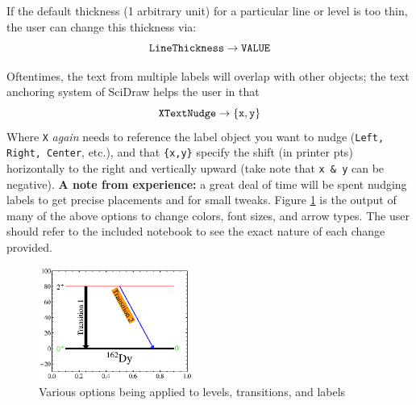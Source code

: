 \documentclass[portrait,10pt]{article}
\begin{document}
If the default thickness (1 arbitrary unit) for a particular line or level is too thin, the user can change this thickness via:
\begin{equation}\label{eq:thickness}
{\tt LineThickness\rightarrow VALUE}
\end{equation}

Oftentimes, the text from multiple labels will overlap with other objects; the text anchoring system of SciDraw helps the user in that 
\begin{equation}\label{eq:TextNudge}
{\tt XTextNudge\rightarrow \{x,y\}}
\end{equation}
Where {\tt X} \textit{again} needs to reference the label object you want to nudge ({\tt Left, Right, Center}, etc.), and that {\tt \{x,y\}} specify the shift (in printer pts) horizontally to the right and vertically upward (take note that {\tt x \& y} can be negative). \textbf{A note from experience:} a great deal of time will be spent nudging labels to get precise placements and for small tweaks. Figure \ref{text:CommonOptions} is the output of many of the above options to change colors, font sizes, and arrow types. The user should refer to the included notebook to see the exact nature of each change provided.
\begin{figure}[h]
\begin{center}
\includegraphics[width=0.45\textwidth]{CommonOptions.eps}
\caption{Various options being applied to levels, transitions, and labels \label{text:CommonOptions}}
\end{center}
\end{figure}
\end{document}
